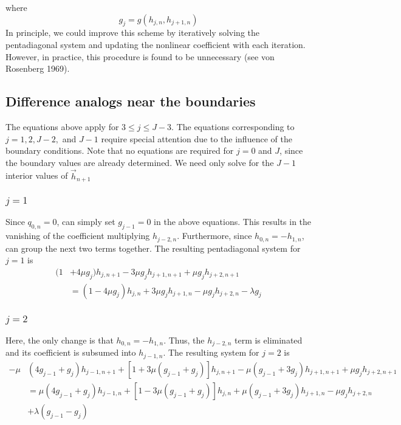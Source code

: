 \documentclass[12pt]{article}
\numberwithin{equation}{section}
\begin{document}
where
\[
	g_{j} = g(h_{j,n},h_{j+1,n})
\]
In principle, we could improve this scheme by iteratively solving the pentadiagonal system and updating the nonlinear coefficient with each iteration. However, in practice, this procedure is found to be unnecessary  (see von Rosenberg 1969).







\subsection{Difference analogs near the boundaries}

The equations above apply for $3 \le j \le J-3$. The equations corresponding to $j = 1, 2, J-2,$ and $J-1$ require special attention due to the influence of the boundary conditions. Note that no equations are required for $j=0$ and $J$, since the boundary values are already determined. We need only solve for the $J-1$ interior values of $\vec{h}_{n+1}$

\subsubsection{$j=1$}

Since $q_{0, n} = 0$, can simply set $g_{j-1} = 0$ in the above equations. This results in the vanishing of the coefficient multiplying $h_{j-2,n}$. Furthermore, since $h_{0,n} = -h_{1,n}$, can group the next two terms together. The resulting pentadiagonal system for $j = 1$ is
\begin{align}
	(1 &+ 4 \mu g_j )h_{j, {n+1}}
	- 3\mu  g_{j} h_{j+1,n+1} 
	+ \mu g_{j} h_{j+2,n+1} 
	\nonumber \\ 
	&=
	(1 - 4 \mu g_j)h_{j,n}
	+ 3\mu g_j h_{j+1,n}
	- \mu g_j h_{j+2,n}
	- \lambda g_j 
\end{align}


\subsubsection{$j=2$}

Here, the only change is that $h_{0,n} = -h_{1,n}$. Thus, the $h_{j-2,n}$ term is eliminated and its coefficient is subsumed into $h_{j-1,n}$. The resulting system for $j = 2$ is
\begin{align}
	-  \mu& (4g_{j-1} + g_{j}) h_{j-1,n+1}
	+[1 + 3 \mu ( g_{j-1}+ g_j )]h_{j, {n+1}}
	- \mu (g_{j-1} + 3 g_{j}) h_{j+1,n+1} 
	+ \mu g_{j} h_{j+2,n+1} 
	\nonumber \\ 
	&=
	\mu (4 g_{j-1}+ g_j ) h_{j-1,n}
	+[1 - 3 \mu (g_{j-1} + g_j)]h_{j,n}
	+ \mu ( g_{j-1}+ 3g_j )h_{j+1,n}
	- \mu g_j h_{j+2,n}
	\nonumber \\ &
	+ \lambda(g_{j-1} - g_{j})
\end{align}
\end{document}

